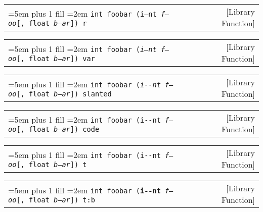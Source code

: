 \documentclass{book}
\newcommand\GNUTexinfocommandstyletextvar[1]{{\normalfont{}\textsl{#1}}}%
\begin{document}
%

\noindent\begin{tabularx}{\linewidth}{@{}Xr}
\rightskip=5em plus 1 fill
\hangindent=2em
\noindent\texttt{int foobar (\textnormal{i--nt}\ \GNUTexinfocommandstyletextvar{f---oo}[,\ float\ \GNUTexinfocommandstyletextvar{b--ar}])\ r}& [Library Function]
\end{tabularx}

%

\noindent\begin{tabularx}{\linewidth}{@{}Xr}
\rightskip=5em plus 1 fill
\hangindent=2em
\noindent\texttt{int foobar (\GNUTexinfocommandstyletextvar{i--nt}\ \GNUTexinfocommandstyletextvar{f---oo}[,\ float\ \GNUTexinfocommandstyletextvar{b--ar}])\ var}& [Library Function]
\end{tabularx}

%

\noindent\begin{tabularx}{\linewidth}{@{}Xr}
\rightskip=5em plus 1 fill
\hangindent=2em
\noindent\texttt{int foobar (\textsl{i{-}{-}nt}\ \GNUTexinfocommandstyletextvar{f---oo}[,\ float\ \GNUTexinfocommandstyletextvar{b--ar}])\ slanted}& [Library Function]
\end{tabularx}

%

\noindent\begin{tabularx}{\linewidth}{@{}Xr}
\rightskip=5em plus 1 fill
\hangindent=2em
\noindent\texttt{int foobar (\texttt{i{-}{-}nt}\ \GNUTexinfocommandstyletextvar{f---oo}[,\ float\ \GNUTexinfocommandstyletextvar{b--ar}])\ code}& [Library Function]
\end{tabularx}

%

\noindent\begin{tabularx}{\linewidth}{@{}Xr}
\rightskip=5em plus 1 fill
\hangindent=2em
\noindent\texttt{int foobar (\texttt{i{-}{-}nt}\ \GNUTexinfocommandstyletextvar{f---oo}[,\ float\ \GNUTexinfocommandstyletextvar{b--ar}])\ t}& [Library Function]
\end{tabularx}

%

\noindent\begin{tabularx}{\linewidth}{@{}Xr}
\rightskip=5em plus 1 fill
\hangindent=2em
\noindent\texttt{int foobar (\texttt{\textbf{i{-}{-}nt}}\ \GNUTexinfocommandstyletextvar{f---oo}[,\ float\ \GNUTexinfocommandstyletextvar{b--ar}])\ t:b}& [Library Function]
\end{tabularx}
\end{document}
